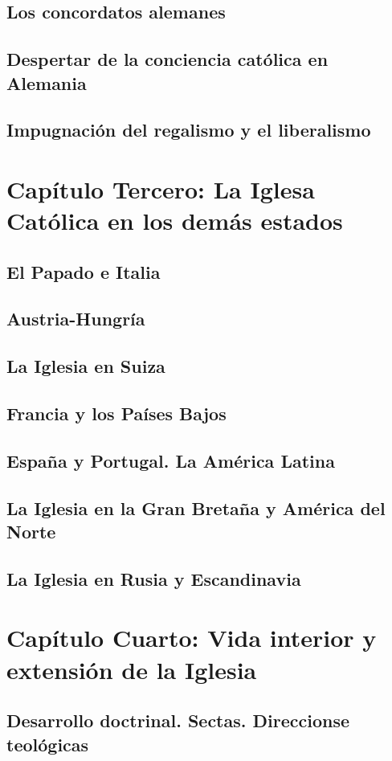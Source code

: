 \raggedbottom{} \documentclass[12pt, a4paper]{book}
\begin{document}
\section{Los concordatos alemanes}
\section{Despertar de la conciencia católica en Alemania}
\section{Impugnación del regalismo y el liberalismo}
\chapter{Capítulo Tercero: La Iglesa Católica en los demás estados}
\section{El Papado e Italia}
\section{Austria-Hungría}
\section{La Iglesia en Suiza}
\section{Francia y los Países Bajos}
\section{España y Portugal. La América Latina}
\section{La Iglesia en la Gran Bretaña y América del Norte}
\section{La Iglesia en Rusia y Escandinavia}
\chapter{Capítulo Cuarto: Vida interior y extensión de la Iglesia}
\section{Desarrollo doctrinal. Sectas. Direccionse teológicas}
\end{document}
